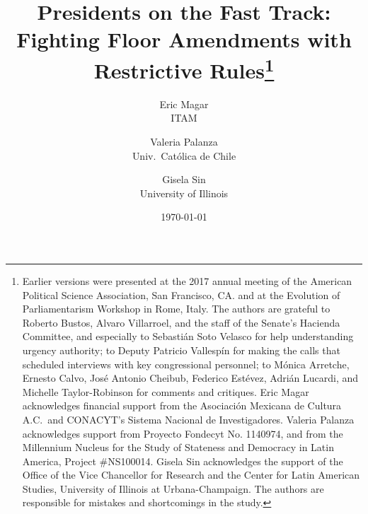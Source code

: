 \documentclass[letter,12pt]{article}
\begin{document}

\title{Presidents on the Fast Track: Fighting Floor Amendments with Restrictive Rules\thanks{Earlier versions were presented at the 2017 annual meeting of the American Political Science Association, San Francisco, CA. and at the Evolution of Parliamentarism Workshop in Rome, Italy. The authors are grateful to Roberto Bustos, Alvaro Villarroel, and the staff of the Senate's Hacienda Committee, and especially to Sebastián Soto Velasco for help understanding urgency authority; to Deputy Patricio Vallespín for making the calls that scheduled interviews with key congressional personnel; to Mónica Arretche, Ernesto Calvo, José Antonio Cheibub, Federico Estévez, Adrián Lucardi, and Michelle Taylor-Robinson for comments and critiques. Eric Magar acknowledges financial support from the Asociación Mexicana de Cultura A.C.\ and CONACYT's Sistema Nacional de Investigadores. Valeria Palanza acknowledges support from Proyecto Fondecyt No. 1140974, and from the Millennium Nucleus for the Study of Stateness and Democracy in Latin America, Project \#NS100014. Gisela Sin acknowledges the support of the Office of the Vice Chancellor for Research and the Center for Latin American Studies, University of Illinois at Urbana-Champaign. The authors are responsible for mistakes and shortcomings in the study.}}
\author{Eric Magar \\ ITAM \and
        Valeria Palanza \\ Univ.\ Católica de Chile \and  
        Gisela Sin \\ University of Illinois
}
\date{\today}
\maketitle

\end{document}
